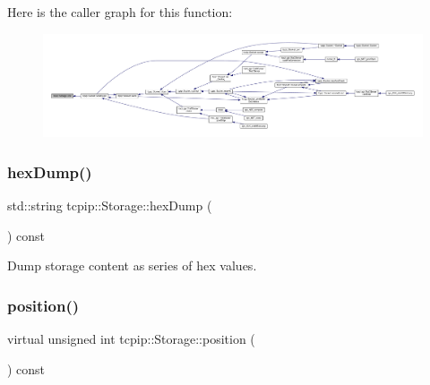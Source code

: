 Here is the caller graph for this function\+:\nopagebreak
\begin{figure}[H]
\begin{center}
\leavevmode
\includegraphics[width=350pt]{classtcpip_1_1_storage_a42a2fec87e26a5a90f56e3d8201559e1_icgraph}
\end{center}
\end{figure}
\mbox{\label{classtcpip_1_1_storage_a841ce58366edb7bea45305614b98eaa4}} 
\subsubsection{\texorpdfstring{hex\+Dump()}{hexDump()}}
{\footnotesize\ttfamily std\+::string tcpip\+::\+Storage\+::hex\+Dump (\begin{DoxyParamCaption}{ }\end{DoxyParamCaption}) const}



Dump storage content as series of hex values. 

\mbox{\label{classtcpip_1_1_storage_a00c4b7b4c74ca5b5418177544bad8dc7}} 
\subsubsection{\texorpdfstring{position()}{position()}}
{\footnotesize\ttfamily virtual unsigned int tcpip\+::\+Storage\+::position (\begin{DoxyParamCaption}{ }\end{DoxyParamCaption}) const\hspace{0.3cm}{\ttfamily [virtual]}}

\mbox{\label{classtcpip_1_1_storage_aaf174f5fbce4103b3b60c6e5da18e9b5}} 
